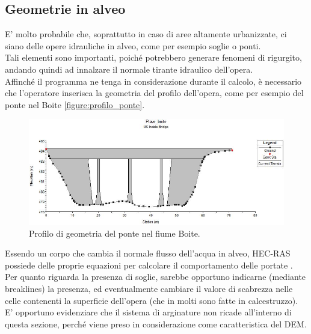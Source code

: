 \subsection{Geometrie in alveo}
E' molto probabile che, soprattutto in caso di aree altamente urbanizzate, ci siano delle opere idrauliche in alveo, come per esempio soglie o ponti.\\
Tali elementi sono importanti, poiché potrebbero generare fenomeni di rigurgito, andando quindi ad innalzare il normale tirante idraulico dell'opera.\\
Affinché il programma ne tenga in considerazione durante il calcolo, è necessario che l'operatore inserisca la geometria del profilo dell'opera, come per esempio del ponte nel Boite \eqref{figure:profilo_ponte}. 
\begin{figure}[htb] \centering
    \includegraphics[scale=0.6]{immagini/profilo_ponte.JPG}
    \caption{Profilo di geometria del ponte nel fiume Boite.}
    \label{figure:profilo_ponte}
\end{figure}
Essendo un corpo che cambia il normale flusso dell'acqua in alveo, HEC-RAS possiede delle proprie equazioni per calcolare il comportamento delle portate \cite{modeling_bridges}.\\
Per quanto riguarda la presenza di soglie, sarebbe opportuno indicarne (mediante breaklines) la presenza, ed eventualmente cambiare il valore di scabrezza nelle celle contenenti la superficie dell'opera (che in molti sono fatte in calcestruzzo).\\
E' opportuno evidenziare che il sistema di arginature non ricade all'interno di questa sezione, perché viene preso in considerazione come caratteristica del DEM.

